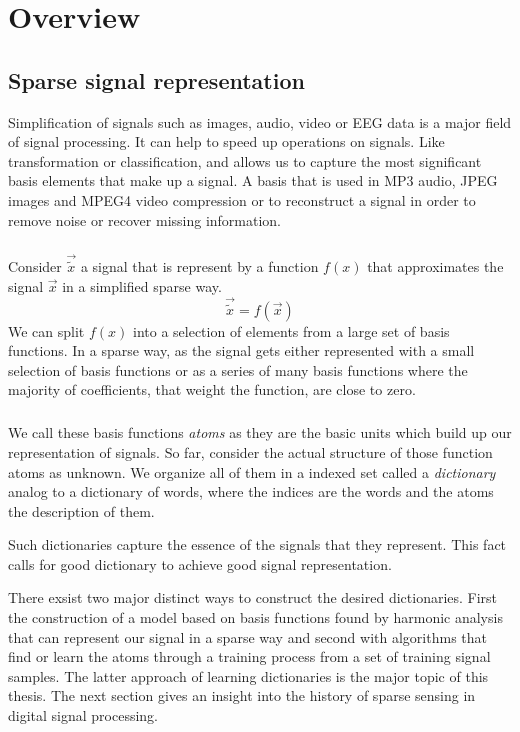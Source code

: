 \chapter{Overview}

\section{Sparse signal representation}
\label{sec:dicts}
Simplification of signals such as images, audio, video or EEG data is a major
field of signal processing. It can help to speed up operations on signals. Like
transformation or classification, and allows us to capture the most
significant basis elements that make up a signal. A basis that is
used in MP3 audio, JPEG images and MPEG4 video compression or to reconstruct
a signal in order to remove noise or recover missing information.

\paragraph{}
Consider $\vec{\tilde{x}}$ a signal that is represent by a function $f(x)$ that
approximates the signal $\vec{x}$ in a simplified sparse way.
\begin{equation*}
\vec{\tilde{x}} = f\left(\vec{x}\right)
\end{equation*}
We can split $f(x)$ into a selection of elements from a large set of
basis functions. In a sparse way, as the signal gets either represented with
a small selection of basis functions or as a series of many basis
functions where the majority of coefficients, that weight the function, are
close to zero. 

\paragraph{}
We call these basis functions \emph{atoms} as they are the basic units
which build up our representation of signals. So far, consider the actual
structure of those function atoms as unknown. We organize all of them in a
indexed set called a \emph{dictionary} analog to a dictionary of words, where
the indices are the words and the atoms the description of them. 

Such dictionaries capture the essence of the signals that they represent.
This fact calls for good dictionary to achieve good signal representation.

There exsist two major distinct ways to construct the desired dictionaries. 
First the construction of a model based on basis functions found by harmonic
analysis that can represent our signal in a sparse way and second with
algorithms that find or learn the atoms through a training process from a set of
training signal samples. The latter approach of learning dictionaries is the
major topic of this thesis. The next section gives an insight into the history
of sparse sensing in digital signal processing. 



